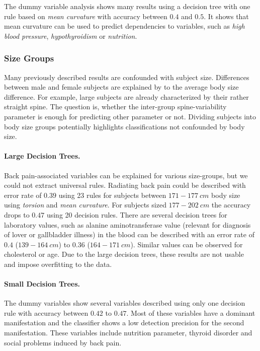 \documentclass[a4paper,twoside]{style/article}
\begin{document}
The dummy variable analysis shows many results using a decision tree with one rule based on \emph{mean curvature} with accuracy between $0.4$ and $0.5$.
It shows that mean curvature can be used to predict dependencies to variables, such as \emph{high blood pressure}, \emph{hypothyroidism} or \emph{nutrition}.

\subsubsection{Size Groups}
Many previously described results are confounded with subject size.
Differences between male and female subjects are explained by to the average body size difference.
For example, large subjects are already characterized by their rather straight spine.
%
The question is, whether the inter-group spine-variability parameter is enough for predicting other parameter or not.
Dividing subjects into body size groups potentially highlights classifications not confounded by body size.
\paragraph{Large Decision Trees. }
Back pain-associated variables can be explained for various size-groups, but we could not extract universal rules.
Radiating back pain could be described with error rate of $0.39$ using 23 rules for subjects between $171-177~cm$ body size using \emph{torsion} and \emph{mean curvature}.
For subjects sized $177-202~cm$ the accuracy drops to $0.47$ using 20  decision rules.
There are several decision trees for laboratory values, such as alanine aminotransferase value (relevant for diagnosis of lover or gallbladder illness) in the blood can be described with an error rate of $0.4$ ($139-164~cm$) to $0.36$ ($164 - 171~cm$).
Similar values can be observed for cholesterol or age.
Due to the large decision trees, these results are not usable and impose overfitting to the data.
\paragraph{Small Decision Trees. }
The dummy variables show several variables described using only one decision rule with accuracy between $0.42$ to $0.47$.
Most of these variables have a dominant manifestation and the classifier shows a low detection precision for the second manifestation.
These variables include nutrition parameter, thyroid disorder and social problems induced by back pain.
\end{document}
